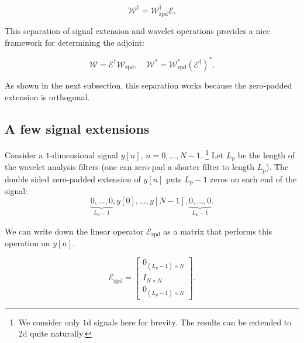 \documentclass[journal]{IEEEtran}
\begin{document}
\[ \mathcal{W}^\dagger = \mathcal{W}^\dagger_\text{zpd}\mathcal{E}. \] 

\noindent This separation of signal extension and wavelet operations provides a nice framework for determining the adjoint:

\[ \mathcal{W} = \mathcal{E}^\dagger\mathcal{W}_\text{zpd}, \quad \mathcal{W}^\ast = \mathcal{W}^\ast_\text{zpd}(\mathcal{E}^\dagger)^\ast. \] 

\noindent As shown in the next subsection, this separation works because the zero-padded extension is orthogonal.\\

\subsection{A few signal extensions}
Consider a $1$-dimensional signal $y[n]$, $n=0,...,N-1$.  \footnote{We consider only $1$d signals here for brevity.  The results can be extended to 2d quite naturally.}  Let $L_p$ be the length of the wavelet analysis filters (one can zero-pad a shorter filter to length $L_p$).  The double sided zero-padded extension of $y[n]$ puts $L_p-1$ zeros on each end of the signal:
\[ \underbrace{0, ..., 0}_{L_p-1}, y[0], ..., y[N-1], \underbrace{0, ..., 0}_{L_p-1}. \]

\noindent We can write down the linear operator $\mathcal{E}_\text{zpd}$ as a matrix that performs this operation on $y[n]$.

\[ \mathcal{E}_\text{zpd} = \begin{bmatrix} 0_{(L_p-1)\times N}\\ I_{N\times N}\\ 0_{(L_p-1)\times N}\end{bmatrix}. \] 
\end{document}
